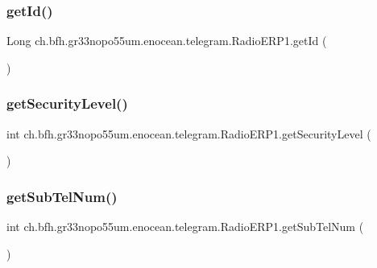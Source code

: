\subsubsection{\texorpdfstring{get\+Id()}{getId()}}
{\footnotesize\ttfamily Long ch.\+bfh.\+gr33nopo55um.\+enocean.\+telegram.\+Radio\+E\+R\+P1.\+get\+Id (\begin{DoxyParamCaption}{ }\end{DoxyParamCaption})}

\hypertarget{classch_1_1bfh_1_1gr33nopo55um_1_1enocean_1_1telegram_1_1_radio_e_r_p1_a62ea5e0cbcdc31fb0ab542ffe2c7e603}{}\label{classch_1_1bfh_1_1gr33nopo55um_1_1enocean_1_1telegram_1_1_radio_e_r_p1_a62ea5e0cbcdc31fb0ab542ffe2c7e603} 
\subsubsection{\texorpdfstring{get\+Security\+Level()}{getSecurityLevel()}}
{\footnotesize\ttfamily int ch.\+bfh.\+gr33nopo55um.\+enocean.\+telegram.\+Radio\+E\+R\+P1.\+get\+Security\+Level (\begin{DoxyParamCaption}{ }\end{DoxyParamCaption})}

\hypertarget{classch_1_1bfh_1_1gr33nopo55um_1_1enocean_1_1telegram_1_1_radio_e_r_p1_a763925119b29245f036f6c08aa1fa76a}{}\label{classch_1_1bfh_1_1gr33nopo55um_1_1enocean_1_1telegram_1_1_radio_e_r_p1_a763925119b29245f036f6c08aa1fa76a} 
\subsubsection{\texorpdfstring{get\+Sub\+Tel\+Num()}{getSubTelNum()}}
{\footnotesize\ttfamily int ch.\+bfh.\+gr33nopo55um.\+enocean.\+telegram.\+Radio\+E\+R\+P1.\+get\+Sub\+Tel\+Num (\begin{DoxyParamCaption}{ }\end{DoxyParamCaption})}

